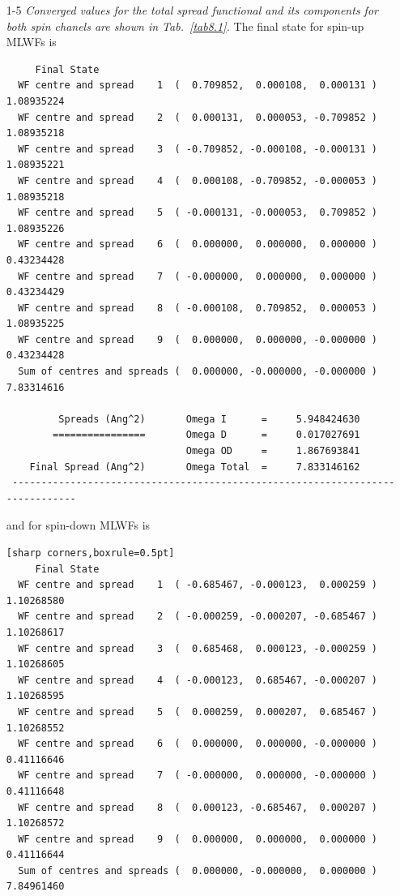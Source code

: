 \begin{enumerate}
	\item[1-5] {\it Converged values for the total spread functional and its components for both spin chanels are shown in Tab.~\ref{tab8.1}.} 
	The final state for spin-up MLWFs is
	\begin{tcolorbox}[sharp corners,boxrule=0.5pt]
	{\small
	\begin{verbatim}
	 Final State
  WF centre and spread    1  (  0.709852,  0.000108,  0.000131 )     1.08935224
  WF centre and spread    2  (  0.000131,  0.000053, -0.709852 )     1.08935218
  WF centre and spread    3  ( -0.709852, -0.000108, -0.000131 )     1.08935221
  WF centre and spread    4  (  0.000108, -0.709852, -0.000053 )     1.08935218
  WF centre and spread    5  ( -0.000131, -0.000053,  0.709852 )     1.08935226
  WF centre and spread    6  (  0.000000,  0.000000,  0.000000 )     0.43234428
  WF centre and spread    7  ( -0.000000,  0.000000,  0.000000 )     0.43234429
  WF centre and spread    8  ( -0.000108,  0.709852,  0.000053 )     1.08935225
  WF centre and spread    9  (  0.000000,  0.000000, -0.000000 )     0.43234428
  Sum of centres and spreads (  0.000000, -0.000000, -0.000000 )     7.83314616
 
         Spreads (Ang^2)       Omega I      =     5.948424630
        ================       Omega D      =     0.017027691
                               Omega OD     =     1.867693841
    Final Spread (Ang^2)       Omega Total  =     7.833146162
 ------------------------------------------------------------------------------
	\end{verbatim}
	}
	\end{tcolorbox}
	and for spin-down MLWFs is
	  \begin{tcolorbox}
  {\small
	\begin{verbatim}[sharp corners,boxrule=0.5pt]
	 Final State
  WF centre and spread    1  ( -0.685467, -0.000123,  0.000259 )     1.10268580
  WF centre and spread    2  ( -0.000259, -0.000207, -0.685467 )     1.10268617
  WF centre and spread    3  (  0.685468,  0.000123, -0.000259 )     1.10268605
  WF centre and spread    4  ( -0.000123,  0.685467, -0.000207 )     1.10268595
  WF centre and spread    5  (  0.000259,  0.000207,  0.685467 )     1.10268552
  WF centre and spread    6  (  0.000000,  0.000000, -0.000000 )     0.41116646
  WF centre and spread    7  ( -0.000000,  0.000000, -0.000000 )     0.41116648
  WF centre and spread    8  (  0.000123, -0.685467,  0.000207 )     1.10268572
  WF centre and spread    9  (  0.000000,  0.000000,  0.000000 )     0.41116644
  Sum of centres and spreads (  0.000000, -0.000000,  0.000000 )     7.84961460
 

\end{verbatim}}
\end{tcolorbox}
\end{enumerate}
